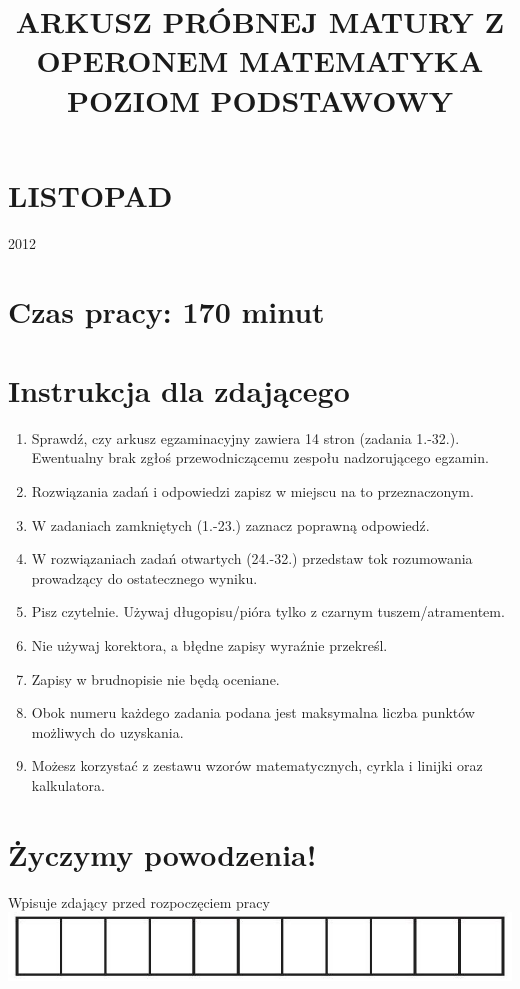 \documentclass[10pt]{article}
\title{ARKUSZ PRÓBNEJ MATURY Z OPERONEM MATEMATYKA \\
 POZIOM PODSTAWOWY }
\author{}
\date{}
\begin{document}
\maketitle
\section*{LISTOPAD}
2012

\section*{Czas pracy: 170 minut}
\section*{Instrukcja dla zdającego}
\begin{enumerate}
  \item Sprawdź, czy arkusz egzaminacyjny zawiera 14 stron (zadania 1.-32.). Ewentualny brak zgłoś przewodniczącemu zespołu nadzorującego egzamin.
  \item Rozwiązania zadań i odpowiedzi zapisz w miejscu na to przeznaczonym.
  \item W zadaniach zamkniętych (1.-23.) zaznacz poprawną odpowiedź.
  \item W rozwiązaniach zadań otwartych (24.-32.) przedstaw tok rozumowania prowadzący do ostatecznego wyniku.
  \item Pisz czytelnie. Używaj długopisu/pióra tylko z czarnym tuszem/atramentem.
  \item Nie używaj korektora, a błędne zapisy wyraźnie przekreśl.
  \item Zapisy w brudnopisie nie będą oceniane.
  \item Obok numeru każdego zadania podana jest maksymalna liczba punktów możliwych do uzyskania.
  \item Możesz korzystać z zestawu wzorów matematycznych, cyrkla i linijki oraz kalkulatora.
\end{enumerate}

\section*{Życzymy powodzenia!}
Wpisuje zdający przed rozpoczęciem pracy\\
\includegraphics[max width=\textwidth, center]{2024_11_21_a38d702bc7be8115942cg-01(1)}
\end{document}
